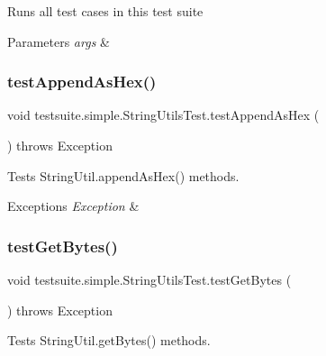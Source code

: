 Runs all test cases in this test suite


\begin{DoxyParams}{Parameters}
{\em args} & \\
\hline
\end{DoxyParams}
\mbox{\label{classtestsuite_1_1simple_1_1_string_utils_test_a9e77da990d423971834bb35bb79cf936}} 
\subsubsection{\texorpdfstring{test\+Append\+As\+Hex()}{testAppendAsHex()}}
{\footnotesize\ttfamily void testsuite.\+simple.\+String\+Utils\+Test.\+test\+Append\+As\+Hex (\begin{DoxyParamCaption}{ }\end{DoxyParamCaption}) throws Exception}

Tests String\+Util.\+append\+As\+Hex() methods.


\begin{DoxyExceptions}{Exceptions}
{\em Exception} & \\
\hline
\end{DoxyExceptions}
\mbox{\label{classtestsuite_1_1simple_1_1_string_utils_test_abbf535f829fabba1d7d3c205c37e092e}} 
\subsubsection{\texorpdfstring{test\+Get\+Bytes()}{testGetBytes()}}
{\footnotesize\ttfamily void testsuite.\+simple.\+String\+Utils\+Test.\+test\+Get\+Bytes (\begin{DoxyParamCaption}{ }\end{DoxyParamCaption}) throws Exception}

Tests String\+Util.\+get\+Bytes() methods.



